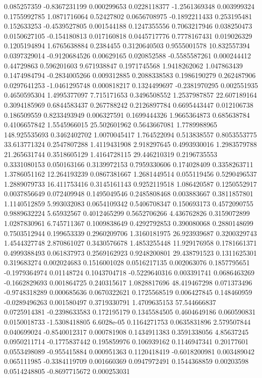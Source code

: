 {    0.085257359	-0.8367231199	0.000299653
    0.0228118377	-1.2561369348	0.003999324
    0.1755992785	1.0871716064	0.52427802
    0.0656708975	-0.1892211433	0.253195481
    0.152633253	-0.4539527805	0.001544188
    0.1247355556	0.7063217946	0.038250473
    0.0150627105	-0.154180813	0.017160818
    0.0445717776	0.7778167431	0.019026329
    0.1205194894	1.6765638884	0.2384455
    0.3120640503	0.9555001578	10.832557394
    0.0397329014	-0.9120684526	0.00629165
    0.020852588	-0.5585587261	0.000244412
    0.44729863	0.596201603	9.671938847
    0.1971745568	1.9418262062	1.047863439
    0.1474984794	-0.2834005266	0.009312885
    0.2088338583	0.1986190279	0.262487906
    0.0297641253	-1.0461295748	0.000818217
    0.1324499697	-0.2381970295	0.002551935
    0.4650595304	1.4995377097	7.715171653
    0.3496508552	1.2537987857	22.607189164
    0.3094185969	0.6844583437	0.267788242
    0.2126897784	0.6695443447	0.012106738
    0.186509559	0.8233493949	0.006327591
    0.1699444326	1.9665364873	0.685638784
    0.4106657842	1.5545966015	25.502601962
    0.5643667081	1.7789988965	148.925535693
    0.3462402702	1.0070045417	1.764522094
    0.513838557	0.8053553775	33.613771324
    0.2547807288	1.4119431908	2.918297645
    0.4993930016	1.2983579788	21.265631744
    0.3518605129	1.4164728115	29.446210319
    0.2196735553	0.3331080153	0.050163166
    0.3139972153	0.7959330606	0.174028409
    0.3358263711	1.3786051162	12.264193239
    0.0867381667	1.2681449514	0.055119456
    0.5290496537	1.2889079733	16.411753416
    0.3145161143	0.9252119518	1.086420587
    0.1250552917	0.0037856649	0.072409948
    0.1495049546	0.2485808468	0.003883667
    0.3811857801	1.1140512859	5.993032083
    0.0654109342	0.5406708347	0.150693173
    0.4572090755	0.9889632224	5.65932567
    0.4012465299	0.5652706266	4.436762826
    0.3159072899	1.0287830961	6.745711367
    0.1009838649	0.4292792853	0.390080068
    0.2880148699	0.7503512944	0.199653339
    0.2960209706	1.3160181975	26.923939687
    0.3200329743	1.4544327748	2.870861027
    0.3430576678	1.4853255448	11.929176958
    0.1781661371	0.4999388493	0.061837973
    0.2569162923	0.9248200801	29.438791523
    0.1311625301	0.319683274	0.002024683
    0.1516001028	0.0516217135	0.002063076
    0.1857795651	-0.1979364974	0.01148724
    0.1043704718	-0.5229640316	0.003391741
    0.0686463269	-0.1662829693	0.001864725
    0.240315617	1.0828817696	48.419467298
    0.071373496	-0.9748318289	0.000685636
    0.0670322621	0.1725568519	0.006427845
    0.148460959	-0.0289496263	0.001580497
    0.3719330791	1.4709635153	57.544666837
    0.0725914381	-0.2398633583	0.172195179
    0.1345584505	0.4604649186	0.060590831
    0.0150018733	-1.5308418805	6.6028e-05
    0.1164271753	0.0635831896	2.579507844
    0.040699024	-0.8540012317	0.000781908
    0.1434911383	0.3591338056	4.85637245
    0.0950211714	-0.1775837442	0.195859976
    0.106939162	0.1146947341	0.20177601
    0.0553498089	-0.955415884	0.000951363
    0.1120418419	-0.6018200981	0.003489042
    0.065111985	-0.3384119709	0.001660369
    0.0947972491	0.1544368859	0.00203598
    0.0514248805	-0.8697715672	0.000253031
} \ProductionCountries

